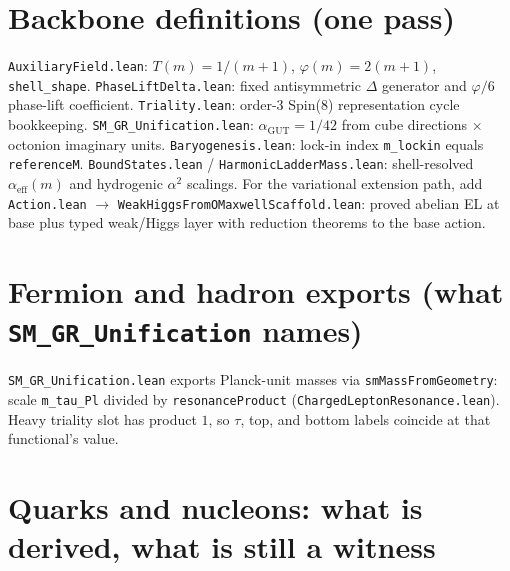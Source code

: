 \documentclass[11pt]{article}
\begin{document}
\section{Backbone definitions (one pass)}
\label{sec:backbone}

\texttt{AuxiliaryField.lean}: $T(m)=1/(m+1)$, $\varphi(m)=2(m+1)$, \texttt{shell\_shape}. \texttt{PhaseLiftDelta.lean}: fixed antisymmetric \(\Delta\) generator and \(\varphi/6\) phase-lift coefficient. \texttt{Triality.lean}: order-3 Spin(8) representation cycle bookkeeping. \texttt{SM\_GR\_Unification.lean}: $\alpha_{\mathrm{GUT}}=1/42$ from cube directions $\times$ octonion imaginary units. \texttt{Baryogenesis.lean}: lock-in index \texttt{m\_lockin} equals \texttt{referenceM}. \texttt{BoundStates.lean} / \texttt{HarmonicLadderMass.lean}: shell-resolved $\alpha_{\mathrm{eff}}(m)$ and hydrogenic $\alpha^2$ scalings.
For the variational extension path, add \texttt{Action.lean} \(\rightarrow\) \texttt{WeakHiggsFromOMaxwellScaffold.lean}: proved abelian EL at base plus typed weak/Higgs layer with reduction theorems to the base action.

\section{Fermion and hadron exports (what \texttt{SM\_GR\_Unification} names)}
\label{sec:fermion}

\texttt{SM\_GR\_Unification.lean} exports Planck-unit masses via \texttt{smMassFromGeometry}: scale \texttt{m\_tau\_Pl} divided by \texttt{resonanceProduct} (\texttt{ChargedLeptonResonance.lean}). Heavy triality slot has product $1$, so $\tau$, top, and bottom labels coincide at that functional's value.

\section{Quarks and nucleons: what is derived, what is still a witness}
\label{sec:quarks}
\end{document}
